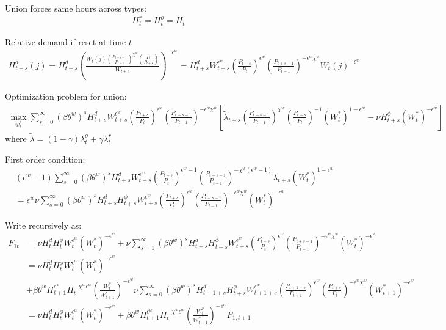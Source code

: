 \documentclass[11pt]{article}
\begin{document}
Union forces same hours across types:
\begin{align*}
	H_t^r = H_t^o = H_t
\end{align*}

Relative demand if reset at time $t$
\begin{align*}
	H_{t+s}^d(j) = H_{t+s}^d \left(\frac{W_{t}(j)(\frac{P_{t+s-1}}{P_{t-1}})^{\chi^w} (\frac{P_t}{P_{t+s}})}{W_{t+s}}\right)^{-\epsilon^w} = H_{t+s}^d W_{t+s}^{\epsilon^w} \left(\frac{P_{t+s}}{P_{t}}\right)^{\epsilon^w} \left(\frac{P_{t+s-1}}{P_{t-1}}\right)^{-\epsilon^w\chi^w}  W_{t}(j)^{-\epsilon^w}
\end{align*}

Optimization problem for union:
\begin{align*}
	\max_{w_t^*} \sum_{s=0}^{\infty} (\beta\theta^w)^{s}H_{t+s}^d W_{t+s}^{\epsilon^w} \left(\frac{P_{t+s}}{P_{t}}\right)^{\epsilon^w}\left(\frac{P_{t+s-1}}{P_{t-1}}\right)^{-\epsilon^w\chi^w}\left[\tilde{\lambda}_{t+s}\left(\frac{P_{t+s-1}}{P_{t-1}}\right)^{\chi^w}\left(\frac{P_{t+s}}{P_{t}}\right)^{-1}(W_t^*)^{1-\epsilon^w}   - \nu H_{t+s}^{\phi} (W_t^*)^{-\epsilon^w}\right]
\end{align*}
where $\tilde{\lambda} = (1-\gamma)\lambda_t^o + \gamma\lambda_t^r$

First order condition:
\begin{align*}
	&(\epsilon^w-1)\sum_{s=0}^{\infty} (\beta\theta^w)^{s}H_{t+s}^d W_{t+s}^{\epsilon^w} \left(\frac{P_{t+s}}{P_{t}}\right)^{\epsilon^w-1} \left(\frac{P_{t+s-1}}{P_{t-1}}\right)^{-\chi^w(\epsilon^w-1)} \tilde{\lambda}_{t+s}(W_t^*)^{1-\epsilon^w}  \\
	& = \epsilon^w \nu \sum_{s=0}^{\infty} (\beta\theta^w)^{s}H_{t+s}^d H_{t+s}^{\phi} W_{t+s}^{\epsilon^w} \left(\frac{P_{t+s}}{P_{t}}\right)^{\epsilon^w} \left(\frac{P_{t+s-1}}{P_{t-1}}\right)^{-\epsilon^w\chi^w}  (W_t^*)^{-\epsilon^w}
\end{align*}


Write recursively as:
\begin{align*}
	F_{1t} & =  \nu H_{t}^d H_{t}^{\phi} W_{t}^{\epsilon^w} (W_t^*)^{-\epsilon^w} + \nu \sum_{s=1}^{\infty} (\beta\theta^w)^{s}H_{t+s}^d H_{t+s}^{\phi} W_{t+s}^{\epsilon^w} \left(\frac{P_{t+s}}{P_{t}}\right)^{\epsilon^w} \left(\frac{P_{t+s-1}}{P_{t-1}}\right)^{-\epsilon^w\chi^w}   (W_t^*)^{-\epsilon^w} \\
	& = \nu H_{t}^d H_{t}^{\phi} W_{t}^{\epsilon^w} (W_t^*)^{-\epsilon^w} \\
	&+ \beta\theta^w \Pi_{t+1}^{\epsilon^w} \Pi_{t}^{-\chi^w\epsilon^w} \left(\frac{W_t^*}{W_{t+1}^*}\right)^{-\epsilon^w}  \nu \sum_{s=0}^{\infty} (\beta\theta^w)^{s}H_{t+1+s}^d H_{t+s}^{\phi} W_{t+1+s}^{\epsilon^w} \left(\frac{P_{t+1+s}}{P_{t+1}}\right)^{\epsilon^w} \left(\frac{P_{t+s}}{P_{t}}\right)^{-\epsilon^w\chi^w}   (W_{t+1}^*)^{-\epsilon^w} \\ 
	& = \nu H_{t}^d H_{t}^{\phi} W_{t}^{\epsilon^w} (W_t^*)^{-\epsilon^w} + \beta\theta^w \Pi_{t+1}^{\epsilon^w} \Pi_{t}^{-\chi^w\epsilon^w}  \left(\frac{W_t^*}{W_{t+1}^*}\right)^{-\epsilon^w} F_{1,t+1} \\ 
\end{align*}
\end{document}
